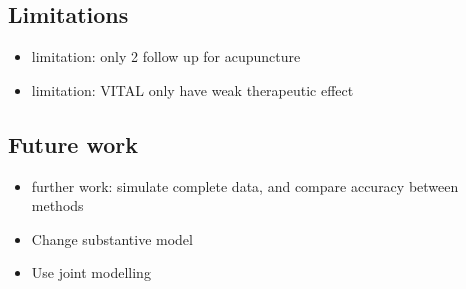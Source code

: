 \documentclass{article}
\providecommand{\tightlist}{%
  \setlength{\itemsep}{0pt}\setlength{\parskip}{0pt}}
\begin{document}
\subsection{Limitations}\label{limitations}

\begin{itemize}
\tightlist
\item
  limitation: only 2 follow up for acupuncture
\item
  limitation: VITAL only have weak therapeutic effect
\end{itemize}

\subsection{Future work}\label{future-work}

\begin{itemize}
\tightlist
\item
  further work: simulate complete data, and compare accuracy between
  methods
\item
  Change substantive model
\item
  Use joint modelling
\end{itemize}



\end{document}
